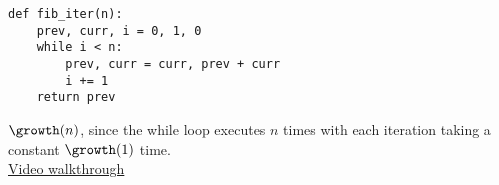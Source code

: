 \begin{blocksection}
\question
\begin{lstlisting}
def fib_iter(n):
    prev, curr, i = 0, 1, 0
    while i < n:
        prev, curr = curr, prev + curr
        i += 1
    return prev
\end{lstlisting}
\begin{solution}[0.0in]
  $\growth(n)$, since the while loop executes $n$ times with each iteration
  taking a constant $\growth(1)$ time.\\
\href{https://www.youtube.com/watch?v=XsdTV6cAAjY&vq=hd1080&t=32m40s}{Video walkthrough}
\end{solution}
\end{blocksection}
